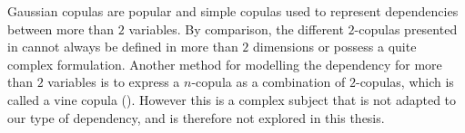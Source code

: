 \begin{remark}
    Gaussian copulas are popular and simple copulas used to represent dependencies between more than $2$ variables. By comparison, the different $2$-copulas presented in  cannot always be defined in more than $2$ dimensions or possess a quite complex formulation. Another method for modelling the dependency for more than $2$ variables is to express a $n$-copula as a combination of $2$-copulas, which is called a vine copula (\cite{czado_vine_2022}). However this is a complex subject that is not adapted to our type of dependency, and is therefore not explored in this thesis.
\end{remark}

